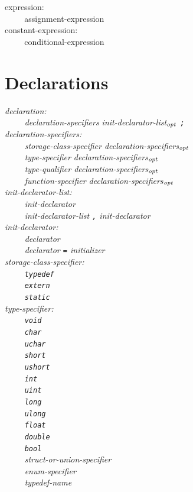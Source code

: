 \documentclass[12pt]{report}
\def\|{\verb|}
\newcommand\opt{$_{{\it opt}}$ }
\begin{document}
\noindent
expression:\\
\|    | assignment-expression\\

\noindent
constant-expression:\\
\|    | conditional-expression\\

\rm
\section{Declarations}
\it
\noindent
declaration:\\
\|    | declaration-specifiers init-declarator-list\opt \verb+;+\\

\noindent
declaration-specifiers:\\
\|    | storage-class-specifier declaration-specifiers\opt\\
\|    | type-specifier declaration-specifiers\opt\\
\|    | type-qualifier declaration-specifiers\opt\\
\|    | function-specifier declaration-specifiers\opt\\

\noindent
init-declarator-list:\\
\|    | init-declarator\\
\|    | init-declarator-list \verb+,+ init-declarator\\

\noindent
init-declarator:\\
\|    | declarator\\
\|    | declarator \verb+=+ initializer\\

\noindent
storage-class-specifier:\\
\|    | \verb+typedef+\\
\|    | \verb+extern+\\
\|    | \verb+static+\\

\noindent
type-specifier:\\
\|    | \verb+void+\\
\|    | \verb+char+\\
\|    | \verb+uchar+\\
\|    | \verb+short+\\
\|    | \verb+ushort+\\
\|    | \verb+int+\\
\|    | \verb+uint+\\
\|    | \verb+long+\\
\|    | \verb+ulong+\\
\|    | \verb+float+\\
\|    | \verb+double+\\
\|    | \verb+bool+\\
\|    | struct-or-union-specifier\\
\|    | enum-specifier\\
\|    | typedef-name\\
\end{document}
